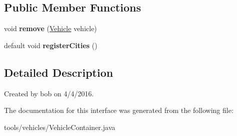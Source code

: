 \subsection*{Public Member Functions}
\begin{DoxyCompactItemize}
\item 
void {\bfseries remove} (\hyperlink{classtools_1_1vehicles_1_1_vehicle}{Vehicle} vehicle)\hypertarget{interfacetools_1_1vehicles_1_1_vehicle_container_ad465910a524d4010efb37daa938a518b}{}\label{interfacetools_1_1vehicles_1_1_vehicle_container_ad465910a524d4010efb37daa938a518b}

\item 
default void {\bfseries register\+Cities} ()\hypertarget{interfacetools_1_1vehicles_1_1_vehicle_container_a1faecde28622c73dd6ba5f5dd62187b0}{}\label{interfacetools_1_1vehicles_1_1_vehicle_container_a1faecde28622c73dd6ba5f5dd62187b0}

\end{DoxyCompactItemize}


\subsection{Detailed Description}
Created by bob on 4/4/2016. 

The documentation for this interface was generated from the following file\+:\begin{DoxyCompactItemize}
\item 
tools/vehicles/Vehicle\+Container.\+java\end{DoxyCompactItemize}
